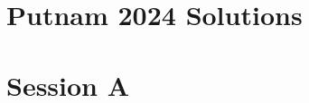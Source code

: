 \documentclass[11pt,a4paper]{article}
\begin{document}
	\newcommand{\la}{\leftarrow}
	\newcommand{\lra}{\leftrightarrow}
	\newcommand{\bbN}{{\mathbb N}}
	\newcommand{\bbZ}{{\mathbb Z}}
	\newcommand{\bbQ}{{\mathbb Q}}
	\newcommand{\bbR}{{\mathbb R}}
	\newcommand{\bbC}{{\mathbb C}}
	\newcommand{\bbH}{{\mathbb H}}
	\newcommand{\bbE}{{\mathbb E}}
	\newcommand{\bbP}{{\mathbb P}}
	\newcommand{\dfeq}{\stackrel{\mathrm{def}}{=}}
	\newcommand{\ra}{\rightarrow}
	\newcommand{\Span}{\mathrm{span}}
	\newcommand{\scrP}{\mathscr{P}}
	\newcommand{\rank}{\mathrm{rank}}
	\newcommand{\nullity}{\mathrm{nullity}}
	\newcommand{\Col}{\mathrm{Col}}
	\newcommand{\Row}{\mathrm{Row}}
	\newcommand{\tr}{\mathrm{tr}}
	\newcommand{\ol}{\overline}
	\newcommand{\norm}[1]{||#1||}
	\newcommand{\doubleline}[1]{\underline{\underline{#1}}}
	\newcommand{\elemop}[1]{\stackrel{#1}{\longrightarrow}}
	\newcommand{\Ind}{\mathrm{Ind}}
	\newcommand{\Res}{\mathrm{Res}}
	\newcommand{\End}{\mathrm{End}}
	\newcommand{\cl}{\mathrm{cl}}
	\newcommand{\code}[1]{\texttt{#1}}
	\newcommand\tab[1][0.5cm]{\hspace*{#1}}
	\newcommand{\<}{\langle}
	\renewcommand{\>}{\rangle}
	\newcommand{\qubits}[1]{|{#1}\rangle}
	\newcommand{\powset}{\mathcal{P}}
	\newcommand{\dsum}{\displaystyle\sum}
	\newcommand{\dprod}{\displaystyle\prod}
	
	\newtheorem{lemma}{Lemma}
	
	\section*{Putnam 2024 Solutions}
	
	\section*{Session A}
	
\end{document}
